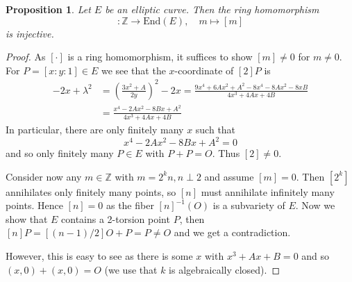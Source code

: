 \documentclass{scrartcl}
\newcommand{\Z}{\mathbb{Z}}
\newcommand{\End}{\mathrm{End}}
\renewcommand{\O}{O}
\newtheorem{prop}{Proposition}[section]
\theoremstyle{definition}
\begin{document}
\begin{prop}
    Let $E$ be an elliptic curve.
    Then the ring homomorphism
    \begin{equation*}
        [\cdot]: \Z \to \End(E), \quad m \mapsto [m]
    \end{equation*}
    is injective.
\end{prop}
\begin{proof}
    As $[\cdot]$ is a ring homomorphism, it suffices to show $[m] \neq 0$ for $m \neq 0$.
    For $P = [x : y : 1] \in E$ we see that the $x$-coordinate of $[2]P$ is
    \begin{align*}
        -2x + \lambda^2 &= \left( \frac {3x^2 + A} {2y} \right)^2 - 2x = \frac {9x^4 + 6Ax^2 + A^2 - 8x^4 - 8Ax^2 - 8xB} {4x^3 + 4Ax + 4B}\\
        &= \frac {x^4 - 2Ax^2 - 8Bx + A^2} {4x^3 + 4Ax + 4B}
    \end{align*}
    In particular, there are only finitely many $x$ such that
    \begin{equation*}
        x^4 - 2Ax^2 - 8Bx + A^2 = 0
    \end{equation*}
    and so only finitely many $P \in E$ with $P + P = \O$.
    Thus $[2] \neq 0$.
    
    Consider now any $m \in \Z$ with $m = 2^k n, n \perp 2$ and assume $[m] = 0$.
    Then $[2^k]$ annihilates only finitely many points, so $[n]$ must annihilate infinitely many points.
    Hence $[n] = 0$ as the fiber $[n]^{-1}(\O)$ is a subvariety of $E$.
    Now we show that $E$ contains a 2-torsion point $P$, then $[n]P = [(n - 1)/2]\O + P = P \neq \O$ and we get a contradiction.

    However, this is easy to see as there is some $x$ with $x^3 + Ax + B = 0$ and so $(x, 0) + (x, 0) = \O$ (we use that $k$ is algebraically closed).
\end{proof}
\end{document}
